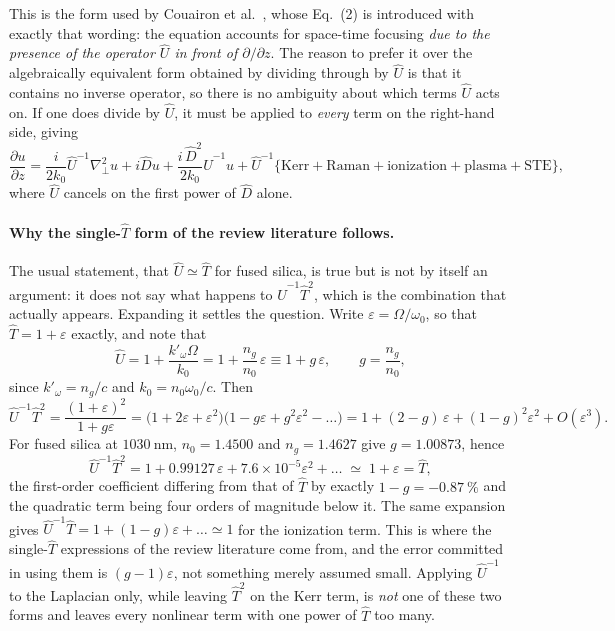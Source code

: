 This is the form used by Couairon et al.~\cite{PhysRevB.71.125435}, whose Eq.~(2) is introduced with exactly that wording: the equation accounts for space-time focusing \emph{due to the presence of the operator $\hat{U}$ in front of $\partial/\partial z$}. The reason to prefer it over the algebraically equivalent form obtained by dividing through by $\hat{U}$ is that it contains no inverse operator, so there is no ambiguity about which terms $\hat{U}$ acts on. If one does divide by $\hat{U}$, it must be applied to \emph{every} term on the right-hand side, giving
\begin{equation}
\label{eq:master_divided}
\frac{\partial u}{\partial z} = \frac{i}{2k_0}\hat{U}^{-1}\nabla_\perp^2 u
 + i\hat{D}u + \frac{i\,\hat{D}^2}{2k_0}\hat{U}^{-1}u
 + \hat{U}^{-1}\Big\{\text{Kerr} + \text{Raman} + \text{ionization} + \text{plasma} + \text{STE}\Big\},
\end{equation}
where $\hat{U}$ cancels on the first power of $\hat{D}$ alone.

\paragraph{Why the single-$\hat{T}$ form of the review literature follows.} The usual statement, that $\hat{U}\simeq\hat{T}$ for fused silica, is true but is not by itself an argument: it does not say what happens to $\hat{U}^{-1}\hat{T}^2$, which is the combination that actually appears. Expanding it settles the question. Write $\varepsilon=\Omega/\omega_0$, so that $\hat{T}=1+\varepsilon$ exactly, and note that
\begin{equation}
\hat{U} = 1+\frac{k'_\omega\Omega}{k_0} = 1+\frac{n_g}{n_0}\,\varepsilon \equiv 1+g\,\varepsilon,
\qquad g=\frac{n_g}{n_0},
\end{equation}
since $k'_\omega=n_g/c$ and $k_0=n_0\omega_0/c$. Then
\begin{equation}
\hat{U}^{-1}\hat{T}^{2} = \frac{(1+\varepsilon)^2}{1+g\varepsilon}
= \big(1+2\varepsilon+\varepsilon^2\big)\big(1-g\varepsilon+g^2\varepsilon^2-\dots\big)
= 1+(2-g)\,\varepsilon+(1-g)^2\varepsilon^2+O(\varepsilon^3).
\end{equation}
For fused silica at $1030\ \text{nm}$, $n_0=1.4500$ and $n_g=1.4627$ give $g=1.00873$, hence
\begin{equation}
\hat{U}^{-1}\hat{T}^{2} = 1+0.99127\,\varepsilon+7.6\times10^{-5}\varepsilon^2+\dots \;\simeq\; 1+\varepsilon = \hat{T},
\end{equation}
the first-order coefficient differing from that of $\hat{T}$ by exactly $1-g=-0.87\ \%$ and the quadratic term being four orders of magnitude below it. The same expansion gives $\hat{U}^{-1}\hat{T}=1+(1-g)\varepsilon+\dots\simeq1$ for the ionization term. This is where the single-$\hat{T}$ expressions of the review literature come from, and the error committed in using them is $(g-1)\varepsilon$, not something merely assumed small. Applying $\hat{U}^{-1}$ to the Laplacian only, while leaving $\hat{T}^2$ on the Kerr term, is \emph{not} one of these two forms and leaves every nonlinear term with one power of $\hat{T}$ too many.

